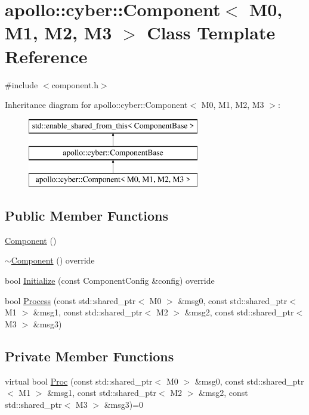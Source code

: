\hypertarget{classapollo_1_1cyber_1_1Component}{\section{apollo\-:\-:cyber\-:\-:Component$<$ M0, M1, M2, M3 $>$ Class Template Reference}
\label{classapollo_1_1cyber_1_1Component}
}


{\ttfamily \#include $<$component.\-h$>$}

Inheritance diagram for apollo\-:\-:cyber\-:\-:Component$<$ M0, M1, M2, M3 $>$\-:\begin{figure}[H]
\begin{center}
\leavevmode
\includegraphics[height=3.000000cm]{classapollo_1_1cyber_1_1Component}
\end{center}
\end{figure}
\subsection*{Public Member Functions}
\begin{DoxyCompactItemize}
\item 
\hyperlink{classapollo_1_1cyber_1_1Component_a37ccb4740d819327ac929b703d8cf9ae}{Component} ()
\item 
\hyperlink{classapollo_1_1cyber_1_1Component_af65ebeab9e345f27089095fe64e3b4f6}{$\sim$\-Component} () override
\item 
bool \hyperlink{classapollo_1_1cyber_1_1Component_ae68b7c7dce67c4d5c6c024c910bb9d92}{Initialize} (const Component\-Config \&config) override
\item 
bool \hyperlink{classapollo_1_1cyber_1_1Component_a3083d711406cfad7c11d60a0fadad274}{Process} (const std\-::shared\-\_\-ptr$<$ M0 $>$ \&msg0, const std\-::shared\-\_\-ptr$<$ M1 $>$ \&msg1, const std\-::shared\-\_\-ptr$<$ M2 $>$ \&msg2, const std\-::shared\-\_\-ptr$<$ M3 $>$ \&msg3)
\end{DoxyCompactItemize}
\subsection*{Private Member Functions}
\begin{DoxyCompactItemize}
\item 
virtual bool \hyperlink{classapollo_1_1cyber_1_1Component_a9c909a2d1b6b53eaf6e4c9d95fc7aaec}{Proc} (const std\-::shared\-\_\-ptr$<$ M0 $>$ \&msg0, const std\-::shared\-\_\-ptr$<$ M1 $>$ \&msg1, const std\-::shared\-\_\-ptr$<$ M2 $>$ \&msg2, const std\-::shared\-\_\-ptr$<$ M3 $>$ \&msg3)=0
\end{DoxyCompactItemize}
